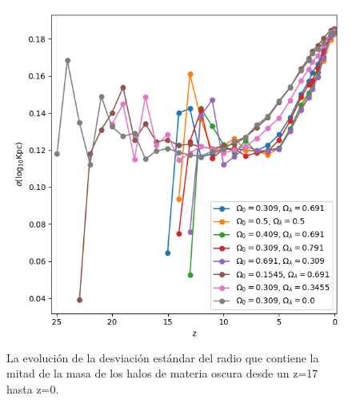 \documentclass{beamer}
\begin{document}
\begin{frame}
\begin{columns}[t]
			\begin{column}{.5\textwidth}
				\begin{figure}
					\centering
					\includegraphics[scale=0.3]{Conc/HalfMassRad_Std_Conc.png}
					\caption{\footnotesize La evolución de la desviación estándar del radio que contiene la mitad de la masa de los halos de materia oscura desde un z=17 hasta z=0.}
					\label{fig:Conc-HalfMassRadStd}
				\end{figure}
			\end{column}
		\end{columns}

	\end{frame}	
\end{document}
